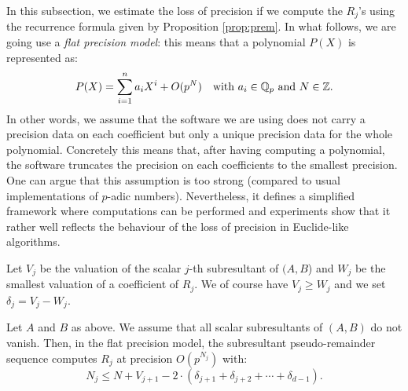 \documentclass{sig-alternate}
\begin{document}
In this subsection, we estimate the loss of precision if we compute the 
$R_j$'s using the recurrence formula given by Proposition \ref{prop:prem}. 
In what follows, we are going use a \emph{flat precision model}: this 
means that a polynomial $P(X)$ is represented as:
$$P(X) = \sum_{i=1}^n a_i X^i + O(p^N)
\quad \text{with } a_i \in \mathbb Q_p \text{ and } N \in \mathbb Z.$$
In other words, we assume that the software we are using does not
carry a precision data on each coefficient but only a unique precision
data for the whole polynomial. Concretely this means that, after having
computing a polynomial, the software truncates the precision on each
coefficients to the smallest precision. 
One can argue that this assumption is too strong (compared to usual
implementations of $p$-adic numbers). Nevertheless, it defines a 
simplified framework where computations can be performed and experiments 
show that it rather well reflects the behaviour of the loss of precision 
in Euclide-like algorithms.

Let $V_j$ be the valuation of the scalar $j$-th subresultant of $(A,B$) 
and $W_j$ be the smallest valuation of a coefficient of $R_j$. We of 
course have $V_j \geq W_j$ and we set $\delta_j = V_j - W_j$.

\begin{prop}
\label{prop:precEuclide}
Let $A$ and $B$ as above. We assume that all scalar subresultants of 
$(A,B)$ do not vanish. Then, in the flat precision model, the 
subresultant pseudo-remainder sequence computes $R_j$ at precision 
$O(p^{N_j})$ with:
$$N_j \leq N + V_{j+1} - 2 \cdot (\delta_{j+1} + \delta_{j+2} + \cdots
+ \delta_{d-1}).$$
\end{prop}
\end{document}
